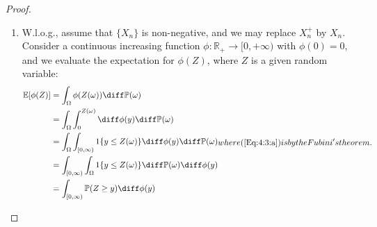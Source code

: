 \begin{proof}
\begin{enumerate}
\item
W.l.o.g., assume that $\{X_n\}$ is non-negative, and we may replace $X_n^+$ by $X_n$.
Consider a continuous increasing function $\phi:\mathbb{R}_+\to[0,+\infty)$ with $\phi(0)=0$, and we evaluate the expectation for $\phi(Z)$, where $Z$ is a given random variable:
\begin{subequations}
\begin{align}
\mathbb{E}[\phi(Z)]
&=\int_{\Omega}\phi(Z(\omega))\diff\mathbb{P}(\omega)\nonumber\\
&=\int_{\Omega}\int_0^{Z(\omega)}\diff\phi(y)\diff\mathbb{P}(\omega)\nonumber\\
&=\int_{\Omega}\int_{[0,\infty)}1\{y\le Z(\omega)\}\diff\phi(y)\diff\mathbb{P}(\omega)\nonumber\\
&=\int_{[0,\infty)}\int_{\Omega}1\{y\le Z(\omega)\}\diff\mathbb{P}(\omega)\diff\phi(y)\label{Eq:4:3:a}\\
&=\int_{[0,\infty)}\mathbb{P}(Z\ge y)\diff\phi(y)\nonumber
\end{align}
where (\ref{Eq:4:3:a}) is by the Fubini's theorem.


\end{subequations}
\end{enumerate}
\end{proof}
